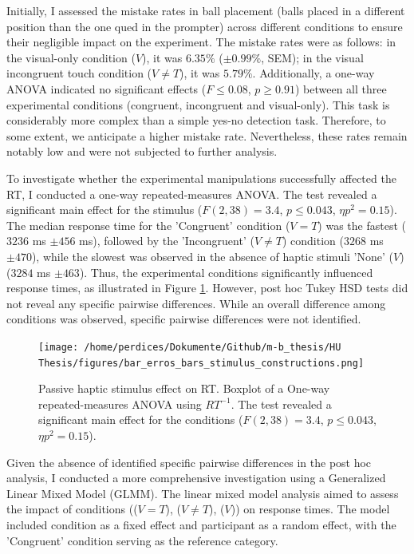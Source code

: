 \documentclass[12pt,oneside,openright]{report}
\begin{document}
Initially, I assessed the mistake rates in ball placement (balls placed in a different position than the one qued in the prompter) across different conditions to ensure their negligible impact on the experiment. The mistake rates were as follows: in the visual-only condition ($V$), it was $6.35\%$ ($\pm 0.99\%$, SEM); in the visual incongruent touch condition ($V \neq T$), it was $5.79\%$. Additionally, a one-way ANOVA indicated no significant effects ($ F \leq 0.08$, $p \geq 0.91$) between all three experimental conditions (congruent, incongruent and visual-only). This task is considerably more complex than a simple yes-no detection task. Therefore, to some extent, we anticipate a higher mistake rate. Nevertheless, these rates remain notably low and were not subjected to further analysis.

To investigate whether the experimental manipulations successfully affected the RT, I conducted a one-way repeated-measures ANOVA. The test revealed a significant main effect for the stimulus ($F(2,38) = 3.4$, $p \leq 0.043$, $\eta p^2 = 0.15$). The median response time for the 'Congruent' condition ($V=T$) was the fastest ($3236$ ms $\pm 456$ ms), followed by the 'Incongruent' ($V \neq T$) condition ($3268$ ms $\pm 470$), while the slowest was observed in the absence of haptic stimuli 'None' ($V$) ($3284$ ms $\pm 463$). Thus, the experimental conditions significantly influenced response times, as illustrated in Figure \ref{fig:error}. However, post hoc Tukey HSD tests did not reveal any specific pairwise differences. While an overall difference among conditions was observed, specific pairwise differences were not identified.

\begin{figure}[!ht]
    \centering
    \texttt{[image: /home/perdices/Dokumente/Github/m-b\_thesis/HU Thesis/figures/bar\_erros\_bars\_stimulus\_constructions.png]}
    \caption{Passive haptic stimulus effect on RT. Boxplot of a One-way repeated-measures ANOVA using \(RT^{-1}\). The test revealed a significant main effect for the conditions (\(F(2,38) = 3.4\), \(p \leq 0.043\), \(\eta p^2 = 0.15\)).
    }
    \label{fig:error}
\end{figure}

Given the absence of identified specific pairwise differences in the post hoc analysis, I conducted a more comprehensive investigation using a Generalized Linear Mixed Model (GLMM).
The linear mixed model analysis aimed to assess the impact of conditions (($V=T$), ($V \neq T$), ($V$)) on response times. The model included condition as a fixed effect and participant as a random effect, with the 'Congruent' condition serving as the reference category.
\end{document}
